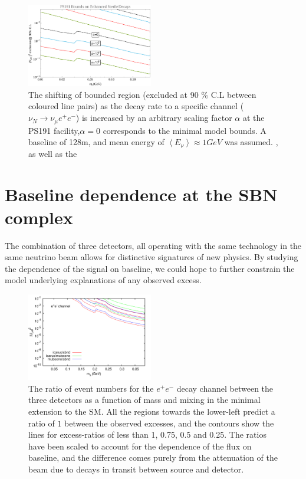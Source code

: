 \documentclass[11pt, a4paper]{article}
\begin{document}
 
\begin{figure}[t]
%
\centering
%
\includegraphics[width=0.49\textwidth]{figures/ps191_enhanced.pdf} 
%
\caption{\label{fig:ps191_enhance}The shifting of bounded region (excluded at
90 \% C.L  between coloured line pairs) as the decay rate to a specific channel
($\nu_N \rightarrow \nu_\mu e^+e^-$) is increased by an arbitrary scaling
factor $\alpha$ at the PS191 facility,$\alpha = 0$ corresponds to the minimal
model bounds. A baseline of 128m, and mean energy of $\left< E_\nu \right>
\approx 1 GeV$ was assumed.  , as well as the }
%
\end{figure}

\section{Baseline dependence at the SBN complex}

The combination of three detectors, all operating with the same technology in
the same neutrino beam allows for distinctive signatures of new physics. By
studying the dependence of the signal on baseline, we could hope to further
constrain the model underlying explanations of any observed excess. 

\begin{figure}[t]
%
\centering
%
\includegraphics[width=0.49\textwidth,clip,trim=0 20 35 10]{figures/baselineratios_ee_um4.pdf} 
%
\caption{\label{fig:baselineratios} The ratio of event numbers for the $e^+e^-$
decay channel between the three detectors as a function of mass and mixing in
the minimal extension to the SM.  All the regions towards the lower-left
predict a ratio of $1$ between the observed excesses, and the contours show the
lines for excess-ratios of less than 1, 0.75, 0.5 and 0.25. The ratios have been scaled
to account for the dependence of the flux on baseline, and the difference comes
purely from the attenuation of the beam due to decays in transit between source
and detector. }
%
\end{figure}
\end{document}

